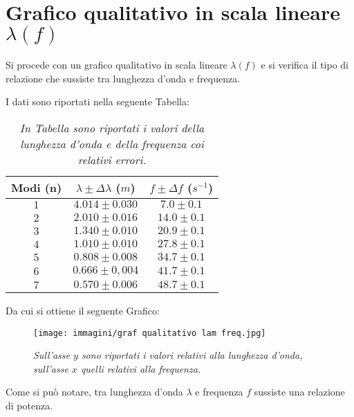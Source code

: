 \documentclass[12pt, a4paper]{article}
\begin{document}
\addvspace{1.5cm}
\section{Grafico qualitativo in scala lineare $\lambda(f)$}
\label{sez: Graf qualitativo}
Si procede con un grafico qualitativo in scala lineare $\lambda(f)$ e si verifica il tipo di relazione che sussiste tra lunghezza d'onda e frequenza. 


I dati sono riportati nella seguente Tabella:
\begin{table}[ht] %
 \centering

\begin{tabular}{|c|c|c|} 
 \hline
  \footnotesize{Modi (n)}& \footnotesize{$\lambda\pm\Delta\lambda$ ($m$)}  & \footnotesize{$f\pm \Delta f $ ($s^{-1}$)} \\ 
\hline
 $1$ & \footnotesize{$4.014\pm0.030$} & \footnotesize{$7.0\pm0.1$} \\   
 $2$ & \footnotesize{$2.010\pm0.016$} & \footnotesize{$14.0\pm0.1$} \\
 $3$ & \footnotesize{$1.340\pm0.010$} & \footnotesize{$20.9\pm0.1$} \\
 $4$ & \footnotesize{$1.010\pm0.010$} & \footnotesize{$27.8\pm0.1$} \\
 $5$ & \footnotesize{$0.808\pm0.008$} & \footnotesize{$34.7\pm0.1$} \\
 $6$ & \footnotesize{$0.666\pm0,004$} & \footnotesize{$41.7\pm0.1$} \\
 $7$ & \footnotesize{$0.570\pm0.006$} & \footnotesize{$48.7\pm0.1$} \\
\hline

\end{tabular}
\caption{\small{\textit{In Tabella sono riportati i valori della lunghezza d'onda e della frequenza coi relativi errori.} }}
    \label{tab:lambda frequenza}
\end{table}
\bigskip

Da cui si ottiene il seguente Grafico:
\begin{figure}[!htb]
\centering
\texttt{[image: immagini/graf qualitativo lam freq.jpg]}
    \centering
    \caption{\textit{Sull'asse $y$ sono riportati i valori relativi alla lunghezza d'onda, sull'asse $x$ quelli relativi alla frequenza.}}
    \label{fig: qualitativo}
\end{figure}

Come si può notare, tra lunghezza d'onda $\lambda$ e frequenza $f$ sussiste una relazione di potenza.
\end{document}
